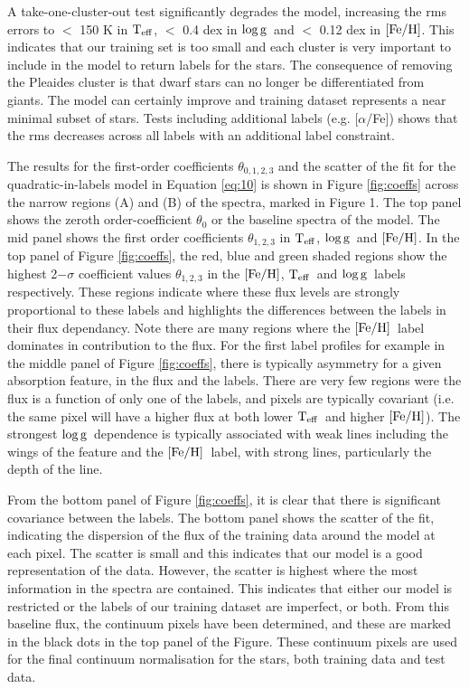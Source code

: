 \documentclass[12pt, preprint]{aastex}
\newcommand{\teff}{\mbox{$\rm T_{eff}$}}
\newcommand{\feh}{\mbox{$\rm [Fe/H]$}}
\newcommand{\logg}{\mbox{$\rm \log g$}}
\begin{document}
A take-one-cluster-out test significantly degrades the model, increasing the rms errors to $<$ 150 K in \teff, $<$ 0.4 dex in \logg\ and $<$ 0.12 dex in \feh. This indicates that our training set is too small and each cluster is very important to include in the model to return labels for the stars. The consequence of removing the Pleaides cluster is that dwarf stars can no longer be differentiated from giants. The model can certainly improve and training dataset represents a near minimal subset of stars. Tests including additional labels (e.g. [$\alpha$/Fe]) shows that the rms decreases across all labels with an additional label constraint. 

The results for the first-order coefficients $\theta_{0,1,2,3}$ and the scatter of the fit for the quadratic-in-labels model in Equation \ref{eq:10} is shown in Figure \ref{fig:coeffs} across the narrow regions (A) and (B) of the spectra, marked in Figure 1. The top panel shows the zeroth order-coefficient $\theta_0$ or the baseline spectra of the model. The mid panel shows the first order coefficients $\theta_{1,2,3}$ in \teff, \logg\ and \feh. In the top panel of Figure \ref{fig:coeffs}, the red, blue and green shaded regions show the highest 2$-\sigma$ coefficient values $\theta_{1,2,3}$ in the \feh, \teff\ and \logg\ labels respectively. These regions indicate where these flux levels are strongly proportional to these labels and highlights the differences between the labels in their flux dependancy. Note there are many regions where the \feh\ label dominates in contribution to the flux. For the first label profiles for example in the middle panel of Figure \ref{fig:coeffs}, there is typically asymmetry for a given absorption feature, in the flux and the labels. There are very few regions were the flux is a function of only one of the labels, and pixels are typically covariant (i.e. the same pixel will have a higher flux at both lower \teff\ and higher \feh). The strongest \logg\ dependence is typically associated with weak lines including the wings of the feature and the \feh\ label, with strong lines, particularly the depth of the line. 

From the bottom panel of Figure \ref{fig:coeffs}, it is clear that there is significant covariance between the labels. The bottom panel shows the scatter of the fit, indicating the dispersion of the flux of the training data around the model at each pixel. The scatter is small and this indicates that our model is a good representation of the data. However, the scatter is highest where the most information in the spectra are contained. This indicates that either our model is restricted or the labels of our training dataset are imperfect, or both. From this baseline flux, the continuum pixels have been determined, and these are marked in the black dots in the top panel of the Figure. These continuum pixels are used for the final continuum normalisation for the stars, both training data and test data. 
\end{document}
